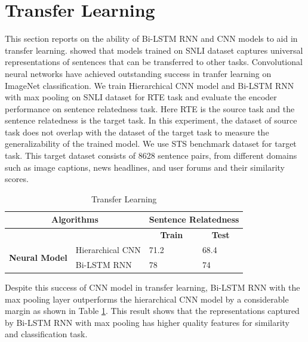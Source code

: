 \documentclass[12pt]{report} %
\begin{document}
\section{Transfer Learning}
\label{TL}

This section reports on the ability of Bi-LSTM RNN and CNN models to aid in transfer learning. \cite{conneau2017supervised} showed that models trained on SNLI dataset captures universal representations of sentences that can be transferred to other tasks. Convolutional neural networks have achieved outstanding success in tranfer learning on ImageNet classification. We train Hierarchical CNN model and Bi-LSTM RNN with max pooling on SNLI dataset for RTE task and evaluate the encoder performance on sentence relatedness task. Here RTE is the source task and the sentence relatedness is the target task. In this experiment, the  dataset of source task does not overlap with the dataset of the target task to measure the generalizability of the trained model.  We use STS benchmark dataset \citep{cer2017semeval} for target task.  This target dataset consists of 8628 sentence pairs, from different domains such as image captions, news headlines, and user forums and their similarity scores.

\begin{table}[htb]
	\centering
	\caption{Transfer Learning}
	\label{transfer}
	\begin{tabular}{|l|l|l|l|}
		\hline
		\multicolumn{2}{|c|}{\textbf{Algorithms}}            & \multicolumn{2}{c|}{\textbf{Sentence Relatedness}}               \\ \hline
		&             & \multicolumn{1}{c|}{\textbf{Train}} & \multicolumn{1}{c|}{\textbf{Test}} \\ \hline
		\multirow{2}{*}{\textbf{Neural Model}} & Hierarchical CNN         & 71.2                                & 68.4                               \\ \cline{2-4} 
		& Bi-LSTM RNN & 78                                  & 74                                 \\ \hline
	\end{tabular}
\end{table}


Despite this success of CNN model in transfer learning, Bi-LSTM RNN with the max pooling layer outperforms the hierarchical CNN model by a considerable margin as shown  in Table \ref{transfer}. This result shows that the representations captured by Bi-LSTM RNN with max pooling has higher quality features for similarity and classification task.
\end{document}
